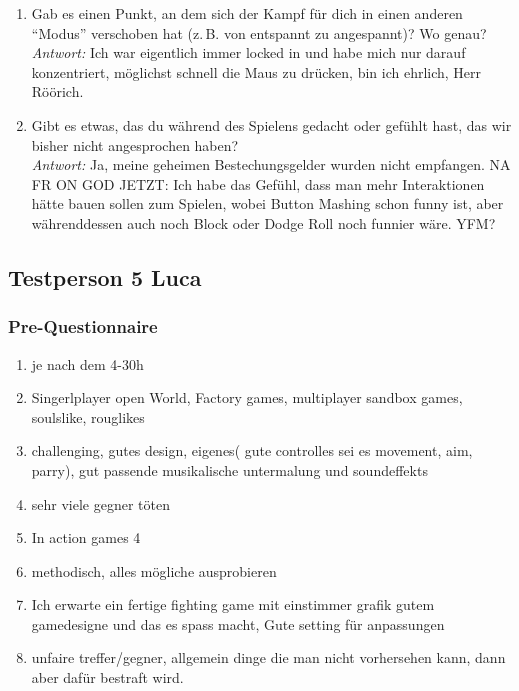 \documentclass[../Main.tex]{subfiles}
\begin{document}
\begin{enumerate}[label=\textbf{I\arabic*}, leftmargin=1.5cm, itemsep=1em]
\item Gab es einen Punkt, an dem sich der Kampf für dich in einen anderen \enquote{Modus} verschoben hat (z.\,B. von entspannt zu angespannt)? Wo genau? \\
\textit{Antwort:} Ich war eigentlich immer locked in und habe mich nur darauf konzentriert, möglichst schnell die Maus zu drücken, bin ich ehrlich, Herr Röörich.

\item Gibt es etwas, das du während des Spielens gedacht oder gefühlt hast, das wir bisher nicht angesprochen haben? \\
\textit{Antwort:} Ja, meine geheimen Bestechungsgelder wurden nicht empfangen. NA FR ON GOD JETZT: Ich habe das Gefühl, dass man mehr Interaktionen hätte bauen sollen zum Spielen, wobei Button Mashing schon funny ist, aber währenddessen auch noch Block oder Dodge Roll noch funnier wäre. YFM?
\end{enumerate}

\subsection{Testperson 5 Luca}

\subsubsection{Pre-Questionnaire}

\begin{enumerate}[label=\textbf{P\arabic*}, leftmargin=1.5cm, itemsep=0.5em]
\item je nach dem 4-30h
\item Singerlplayer open World, Factory games, multiplayer sandbox games, soulslike, rouglikes
\item challenging, gutes design, eigenes( gute controlles sei es movement, aim, parry), gut passende musikalische untermalung und soundeffekts
\item sehr viele gegner töten
\item In action games 4
\item methodisch, alles mögliche ausprobieren
\item Ich erwarte ein fertige fighting game mit einstimmer grafik gutem gamedesigne und das es spass macht, Gute setting für anpassungen
\item unfaire treffer/gegner, allgemein dinge die man nicht vorhersehen kann, dann aber dafür bestraft wird.
\end{enumerate}
\end{document}
